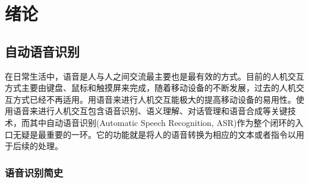 
\chapter{绪论}
\label{chap:intro0}

\section{自动语音识别}
\label{chap:intro0-asr}


在日常生活中，语音是人与人之间交流最主要也是最有效的方式。目前的人机交互方式主要由键盘、鼠标和触摸屏来完成，随着移动设备的不断发展，过去的人机交互方式已经不再适用。用语音来进行人机交互能极大的提高移动设备的易用性。使用语音来进行人机交互包含语音识别、语义理解、对话管理和语音合成等关键技术，而其中自动语音识别(Automatic Speech Recognition, ASR)作为整个闭环的入口无疑是最重要的一环。它的功能就是将人的语音转换为相应的文本或者指令以用于后续的处理。

\subsection{语音识别简史}
\label{chap:intro0-asr-history}


